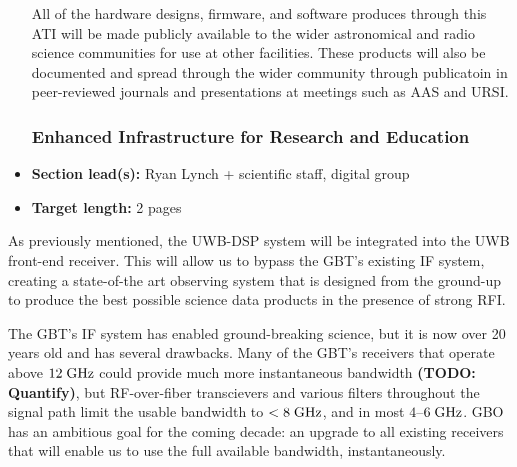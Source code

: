 \documentclass[10pt]{myNSF}
\begin{document}
\begin{itemize}
All of the hardware designs, firmware, and software produces through
this ATI will be made publicly available to the wider astronomical and
radio science communities for use at other facilities.  These products
will also be documented and spread through the wider community through
publicatoin in peer-reviewed journals and presentations at meetings
such as AAS and URSI.  

\subsubsection{Enhanced Infrastructure for Research and Education}
\label{sec:infrastructure}

\item{\textbf{Section lead(s):} Ryan Lynch + scientific staff, digital
    group}
\item{\textbf{Target length:} 2 pages}
\end{itemize}


As previously mentioned, the UWB-DSP system will be integrated into
the UWB front-end receiver.  This will allow us to bypass the GBT's
existing IF system, creating a state-of-the art observing system that
is designed from the ground-up to produce the best possible science
data products in the presence of strong RFI.  


The GBT's IF system has enabled ground-breaking science, but it is now
over 20 years old and has several drawbacks.  Many of the GBT's
receivers that operate above $12\; \textrm{GHz}$ could provide much more
instantaneous bandwidth \textbf{(TODO: Quantify)}, but RF-over-fiber
transcievers and various filters throughout the signal path limit the
usable bandwidth to $< 8\; \textrm{GHz}$, and in most $4$--$6\; \textrm{GHz}$.  GBO
has an ambitious goal for the coming decade: an upgrade to all
existing receivers that will enable us to use the full available
bandwidth, instantaneously.  
\end{document}
